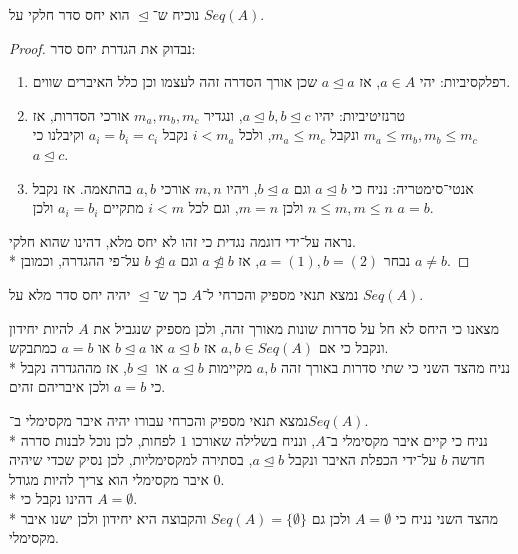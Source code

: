 \Question{}
\Subquestion{}
נוכיח ש־$\trianglelefteq$ הוא יחס סדר חלקי על $Seq(A)$.
\begin{proof}
	נבדוק את הגדרת יחס סדר:
	\begin{enumerate}
		\item רפלקסיביות: יהי $a \in A$, אז $a \trianglelefteq a$ שכן אורך הסדרה זהה לעצמו וכן כלל האיברים שווים.
		\item טרנזיטיביות: יהיו $a \trianglelefteq b, b \trianglelefteq c$, ונגדיר $m_a, m_b, m_c$ אורכי הסדרות,
			אז $m_a \le m_b, m_b \le m_c$ ונקבל $m_a \le m_c$, ולכל $i < m_a$ נקבל $a_i = b_i = c_i$ וקיבלנו כי $a \trianglelefteq c$.
		\item אנטי־סימטריה: נניח כי $a \trianglelefteq b$ וגם $b \trianglelefteq a$, ויהיו $m, n$ אורכי $a, b$ בהתאמה.
			אז נקבל $n \le m, m \le n$ ולכן $m = n$, וגם לכל $i < m$ מתקיים $a_i = b_i$ ולכן $a = b$.
	\end{enumerate}

	נראה על־ידי דוגמה נגדית כי זהו לא יחס מלא, דהינו שהוא חלקי. \\*
	נבחר $a = (1), b = (2)$, אז $a \not\trianglelefteq b$ וגם $b \not\trianglelefteq a$ על־פי ההגדרה, וכמובן $a \ne b$.
\end{proof}

\Subquestion{}
נמצא תנאי מספיק והכרחי ל־$A$ כך ש־$\trianglelefteq$ יהיה יחס סדר מלא על $Seq(A)$.

מצאנו כי היחס לא חל על סדרות שונות מאורך זהה, ולכן מספיק שנגביל את $A$ להיות יחידון ונקבל כי אם $a, b \in Seq(A)$ אז $a \trianglelefteq b$ או $b \trianglelefteq a$ או $a = b$ כמתבקש. \\*
נניח מהצד השני כי שתי סדרות באורך זהה $a, b$ מקיימות $a \trianglelefteq b$ או $b \trianglelefteq$, אז מההגדרה נקבל כי $a = b$ ולכן איבריהם זהים.

\Subquestion{}
נמצא תנאי מספיק והכרחי עבורו יהיה איבר מקסימלי ב־$Seq(A)$. \\*
נניח כי קיים איבר מקסימלי ב־$A$, ונניח בשלילה שאורכו $1$ לפחות, לכן נוכל לבנות סדרה חדשה $b$ על־ידי הכפלת האיבר ונקבל $a \trianglelefteq b$, בסתירה למקסימליות, לכן נסיק שכדי שיהיה איבר מקסימלי הוא צריך להיות מגודל $0$. \\*
דהינו נקבל כי $A = \emptyset$. \\*
מהצד השני נניח כי $A = \emptyset$ ולכן גם $Seq(A) = \{ \emptyset \}$ והקבוצה היא יחידון ולכן ישנו איבר מקסימלי.


